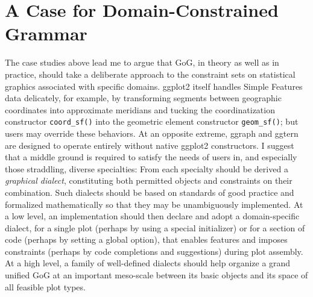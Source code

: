 \documentclass{vgtc}                          %
\newcommand{\pkg}[1]{\textsf{#1}}
\begin{document}
\section{A Case for Domain-Constrained Grammar}

The case studies above lead me to argue that GoG, in theory as well as in practice, should take a deliberate approach to the constraint sets on statistical graphics associated with specific domains.
\pkg{ggplot2} itself handles Simple Features data delicately, for example, by transforming segments between geographic coordinates into approximate meridians and tucking the coordinatization constructor \texttt{coord\_sf()} into the geometric element constructor \texttt{geom\_sf()}; but users may override these behaviors.
At an opposite extreme, \pkg{ggraph} and \pkg{ggtern} are designed to operate entirely without native \pkg{ggplot2} constructors.
I suggest that a middle ground is required to satisfy the needs of users in, and especially those straddling, diverse specialties:
From each specialty should be derived a \emph{graphical dialect}, constituting both permitted objects and constraints on their combination.
Such dialects should be based on standards of good practice and formalized mathematically so that they may be unambiguously implemented.
At a low level, an implementation should then declare and adopt a domain-specific dialect, for a single plot (perhaps by using a special initializer) or for a section of code (perhaps by setting a global option), that enables features and imposes constraints (perhaps by code completions and suggestions) during plot assembly.
At a high level, a family of well-defined dialects should help organize a grand unified GoG at an important meso-scale between its basic objects and its space of all feasible plot types.

%

%
%
%


\end{document}
